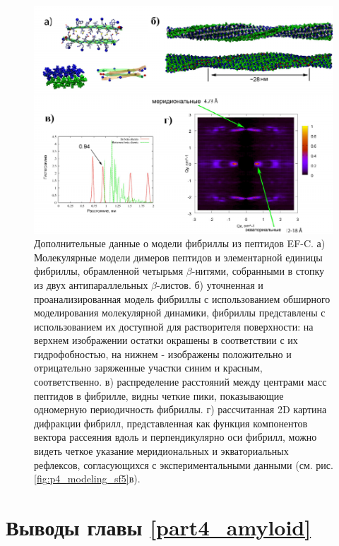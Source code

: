 \begin{figure} [H]
    \centering
    \includegraphics[width=\textwidth]{images/p4/natnanotech2013/modeling/p4_modeling_sf6.pdf}
    \caption[Дополнительные данные о модели фибриллы из пептидов EF-C]{Дополнительные данные о модели фибриллы из пептидов EF-C. а) Молекулярные модели димеров пептидов и элементарной единицы фибриллы, обрамленной четырьмя $\beta$-нитями, собранными в стопку из двух антипараллельных $\beta$-листов. б) уточненная и проанализированная модель фибриллы с использованием обширного моделирования молекулярной динамики, фибриллы представлены с использованием их доступной для растворителя поверхности: на верхнем изображении остатки окрашены в соответствии с их гидрофобностью, на нижнем - изображены положительно и отрицательно заряженные участки синим и красным, соответственно. в) распределение расстояний между центрами масс пептидов в фибрилле, видны четкие пики, показывающие одномерную периодичность фибриллы. г) рассчитанная 2D картина дифракции фибрилл, представленная как функция компонентов вектора рассеяния вдоль и перпендикулярно оси фибрилл, можно видеть четкое указание меридиональных и экваториальных рефлексов, согласующихся с экспериментальными данными (см.  рис. \ref{fig:p4_modeling_sf5}в).}
    \label{fig:p4_modeling_sf6}
\end{figure}




\section{Выводы главы \ref{part4_amyloid}}


